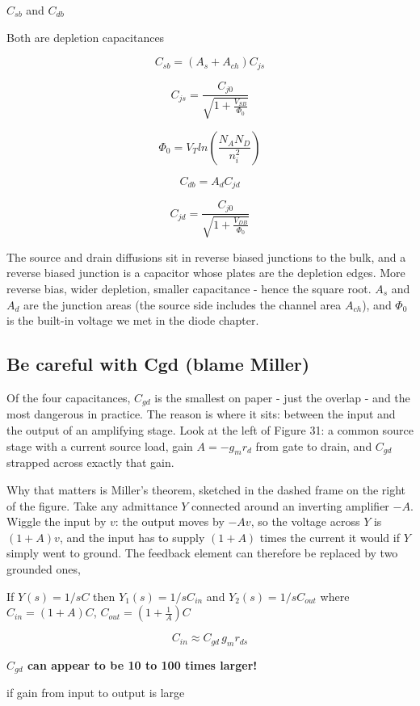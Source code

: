 \(C_{sb}\) and \(C_{db}\)

Both are depletion capacitances

\[ C_{sb} = (A_s + A_{ch}) C_{js} \]

\[ C_{js} = \frac{C_{j0}}{\sqrt{1 + \frac{V_{SB}}{\Phi_0}}} \]

\[\Phi_0 = V_T ln\left(\frac{N_A N_D}{n_i^2}\right)\]

\[ C_{db} = A_d C_{jd} \]

\[ C_{jd} = \frac{C_{j0}}{\sqrt{1 + \frac{V_{DB}}{\Phi_0}}} \]

The source and drain diffusions sit in reverse biased junctions to the
bulk, and a reverse biased junction is a capacitor whose plates are the
depletion edges. More reverse bias, wider depletion, smaller capacitance
- hence the square root. \(A_s\) and \(A_d\) are the junction areas (the
source side includes the channel area \(A_{ch}\)), and \(\Phi_0\) is the
built-in voltage we met in the diode chapter.

\subsection{Be careful with Cgd (blame
Miller)}\label{be-careful-with-cgd-blame-miller}

Of the four capacitances, \(C_{gd}\) is the smallest on paper - just the
overlap - and the most dangerous in practice. The reason is where it
sits: between the input and the output of an amplifying stage. Look at
the left of Figure 31: a common source stage with a current source load,
gain \(A = -g_m r_{d}\) from gate to drain, and \(C_{gd}\) strapped
across exactly that gain.

Why that matters is Miller's theorem, sketched in the dashed frame on
the right of the figure. Take any admittance \(Y\) connected around an
inverting amplifier \(-A\). Wiggle the input by \(v\): the output moves
by \(-Av\), so the voltage across \(Y\) is \((1+A)v\), and the input has
to supply \((1+A)\) times the current it would if \(Y\) simply went to
ground. The feedback element can therefore be replaced by two grounded
ones,

If \(Y(s) = 1/sC\) then \(Y_1(s) = 1/sC_{in}\) and
\(Y_2(s) = 1/sC_{out}\) where \(C_{in} = (1 + A) C\),
\(C_{out} = (1 + \frac{1}{A})C\)

\[ C_{in} \approx C_{gd}\, g_{m} r_{ds} \]

\textbf{\(C_{gd}\) can appear to be 10 to 100 times larger!}

if gain from input to output is large


